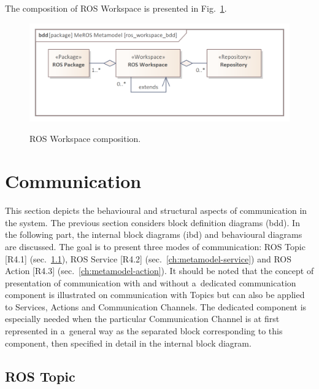 \documentclass[11pt,oneside,a4paper]{report}
\begin{document}
The composition of ROS Workspace is presented in Fig.~\ref{fig:ros_workspace_bdd}.

	\begin{figure}[H]
		\centering
		\begin{center}
			{\includegraphics[scale=1.0]{img/meros_pkg/ros_workspace_bdd.png}}
		\end{center}
		\caption{ROS Workspace composition.} 
		\label{fig:ros_workspace_bdd}
	\end{figure}
	
\pagebreak

\section{Communication}
\label{sec:metamodel-communication}
	
	This section depicts the behavioural and structural aspects of communication in the system. The previous section considers block definition diagrams (bdd). In the following part, the internal block diagrams (ibd) and behavioural diagrams are discussed. The goal is to present three modes of communication: ROS Topic [R4.1] (sec.~\ref{ch:metamodel-topic}), ROS Service [R4.2] (sec.~\ref{ch:metamodel-service}) and ROS Action [R4.3] (sec.~\ref{ch:metamodel-action}). It should be noted that the concept of presentation of communication with and without a~dedicated communication component is illustrated on communication with Topics but can also be applied to Services, Actions and Communication Channels. The dedicated component is especially needed when the particular Communication Channel is at first represented in a~general way as the separated block corresponding to this component, then specified in detail in the internal block diagram. 
	
	\subsection{ROS Topic}
	\label{ch:metamodel-topic}
		
\end{document}
